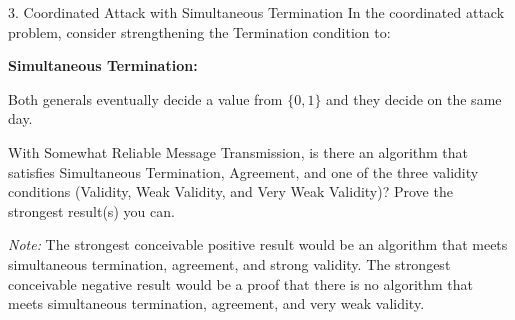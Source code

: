 \documentclass[12pt]{article}
\begin{document}
\newpage

\begin{problem}{3. Coordinated Attack with Simultaneous Termination}
In the coordinated attack problem, consider strengthening the Termination condition to:
\begin{tcolorbox}
    \textbf{Simultaneous Termination:} 
    
    Both generals eventually decide a value from $\{0, 1\}$ and they decide on the same day.
\end{tcolorbox}
With Somewhat Reliable Message Transmission, is there an algorithm that satisfies Simultaneous Termination, Agreement, and one of the three validity conditions (Validity, Weak Validity, and Very Weak Validity)? Prove the strongest result(s) you can.

\medskip
\noindent\textit{Note:} The strongest conceivable positive result would be an algorithm that meets simultaneous termination, agreement, and strong validity. The strongest conceivable negative result would be a proof that there is no algorithm that meets simultaneous termination, agreement, and very weak validity.
\end{problem}
\end{document}
